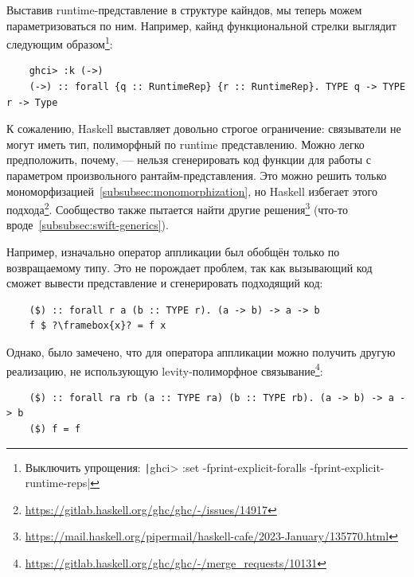 Выставив runtime-представление в структуре кайндов, мы теперь можем параметризоваться по ним.
Например, кайнд функциональной стрелки выглядит следующим образом\footnote{Выключить упрощения: \texttt|ghci> :set -fprint-explicit-foralls -fprint-explicit-runtime-reps|}:
\begin{verbatim}
    ghci> :k (->)
    (->) :: forall {q :: RuntimeRep} {r :: RuntimeRep}. TYPE q -> TYPE r -> Type
\end{verbatim}

К сожалению, Haskell выставляет довольно строгое ограничение: связыватели не могут иметь тип, полиморфный по runtime представлению.
Можно легко предположить, почему, --- нельзя сгенерировать код функции для работы с параметром произвольного рантайм-представления.
Это можно решить только мономорфизацией~\ref{subsubsec:monomorphization}, но Haskell избегает этого подхода\footnote{\url{https://gitlab.haskell.org/ghc/ghc/-/issues/14917}}.
Сообщество также пытается найти другие решения\footnote{\url{https://mail.haskell.org/pipermail/haskell-cafe/2023-January/135770.html}} (что-то вроде~\ref{subsubsec:swift-generics}).

Например, изначально оператор аппликации был обобщён только по возвращаемому типу.
Это не порождает проблем, так как вызывающий код сможет вывести представление и сгенерировать подходящий код:
\begin{verbatim}
    ($) :: forall r a (b :: TYPE r). (a -> b) -> a -> b
    f $ ?\framebox{x}? = f x
\end{verbatim}

Однако, было замечено, что для оператора аппликации можно получить другую реализацию, не использующую levity-полиморфное связывание\footnote{\url{https://gitlab.haskell.org/ghc/ghc/-/merge_requests/10131}}:
\begin{verbatim}
    ($) :: forall ra rb (a :: TYPE ra) (b :: TYPE rb). (a -> b) -> a -> b
    ($) f = f
\end{verbatim}
